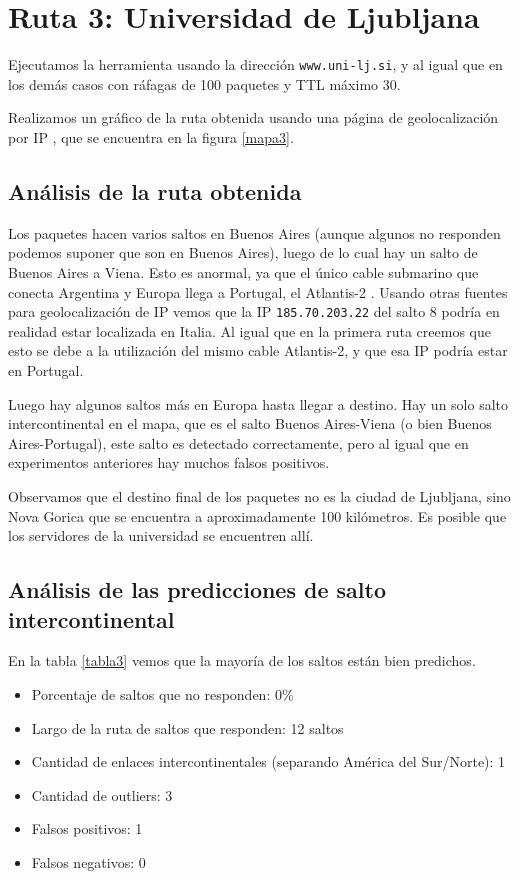 \section{Ruta 3: Universidad de Ljubljana}

Ejecutamos la herramienta usando la dirección \texttt{www.uni-lj.si}, y al igual que en los demás casos con ráfagas de 100 paquetes y TTL máximo 30.

Realizamos un gráfico de la ruta obtenida usando una página de geolocalización por IP \cite{ip2location}, que se encuentra en la figura \ref{mapa3}.

\subsection{Análisis de la ruta obtenida}

Los paquetes hacen varios saltos en Buenos Aires (aunque algunos no responden podemos suponer que son en Buenos Aires), luego de lo cual hay un salto de Buenos Aires a Viena. Esto es anormal, ya que el único cable submarino que conecta Argentina y Europa llega a Portugal, el Atlantis-2 \cite{atlantis2}. Usando otras fuentes para geolocalización de IP vemos que la IP \texttt{185.70.203.22} del salto 8 podría en realidad estar localizada en Italia. Al igual que en la primera ruta creemos que esto se debe a la utilización del mismo cable Atlantis-2, y que esa IP podría estar en Portugal.

Luego hay algunos saltos más en Europa hasta llegar a destino. Hay un solo salto intercontinental en el mapa, que es el salto Buenos Aires-Viena (o bien Buenos Aires-Portugal), este salto es detectado correctamente, pero al igual que en experimentos anteriores hay muchos falsos positivos.

Observamos que el destino final de los paquetes no es la ciudad de Ljubljana, sino Nova Gorica que se encuentra a aproximadamente 100 kilómetros. Es posible que los servidores de la universidad se encuentren allí.

\subsection{Análisis de las predicciones de salto intercontinental}

En la tabla \ref{tabla3} vemos que la mayoría de los saltos están bien predichos.

\begin{itemize}
	\item Porcentaje de saltos que no responden: 0\%
	\item Largo de la ruta de saltos que responden: 12 saltos 
	\item Cantidad de enlaces intercontinentales (separando América del Sur/Norte): 1
	\item Cantidad de outliers: 3
	\item Falsos positivos: 1
	\item Falsos negativos: 0
\end{itemize}


